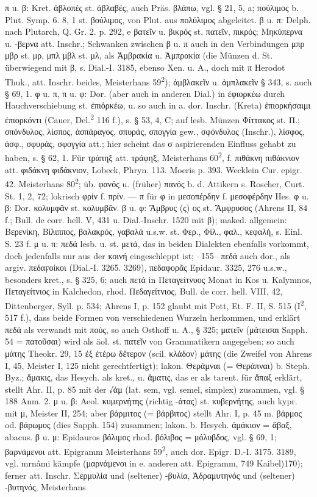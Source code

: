 π u. β: Kret. ἀβλοπές st. ἀβλαβές, auch Präs. βλάπω, vgl. § 21, 5, a;  πούλιμος b. Plut. Symp. 6. 8, 1 st. βούλιμος, von Plut. aus πολύλιμος abgeleitet. β u. π: Delph. nach Plutarch, Q. Gr. 2. p. 292, e βατεῖν u. βικρός st. πατεῖν, πικρός; Μηκύπερνα u. -βερνα att. Inschr.; Schwanken zwischen β u. π auch in den Verbindungen μπρ μβρ st. μρ, μπλ μβλ st. μλ, als Ἀμβρακία u. Ἀμπρακία (die Münzen d. St. überwiegend mit β, s. Dial.-I. 3185, ebenso Xen. u. A., doch mit π Herodot Thuk., att. Inschr. beides, Meisterhans 59\textsuperscript{2}); ἀμβλακεῖν u. ἀμπλακεῖν § 343, s. auch § 69, 1. φ u. π, π u. φ: Dor. (aber auch in anderen Dial.) in ἐφιορκέω durch Hauchverschiebung st. ἐπιὁρκέω, u. so auch in a. dor. Inschr. (Kreta) ἐπιορκήσαιμι ἐπιορκόντι (Cauer, Del.\textsuperscript{2} 116 f.), s. § 53, 4, C; auf lesb. Münzen Φίττακος st. Π.; σπόνδυλος, λίσπος, ἀσπάραγος, σπυράς, σπογγία gew., σφόνδυλος (Inschr.), λίσφος, ἀσφ., σφυράς, σφογγία att.; hier scheint das σ aspirierenden Einfluss gehabt zu haben, s. § 62, 1. Für τράπηξ att. τράφηξ, Meisterhans 60\textsuperscript{2}, f. πιθάκνη πιθάκνιον att. φιδάκνη φιδάκνιον, Lobeck, Phryn. 113. Moeris p. 393. Wecklein Cur. epigr. 42. Meisterhans 80\textsuperscript{2}; üb. φανός u. (früher) πανός b. d. Attikern s. Roscher, Curt. St. 1, 2, 72; lokrisch φρίν f. πρίν. — π für φ in μεσοπέρδην f. μεσοφέρδην Hes. φ u. β: Dor. κολυμφᾶν st. κολυμβᾶν. β u. φ: Ἄμβρυς (ς) ος st. Ἄμφρυσος (Ahrens II, 84 f.; Bull. de corr. hell. V, 431 u. Dial.-Inschr. 1520 mit β); maked. allgemein: Βερενίκη, Βίλιππος, βαλακρός, γαβαλά u.s.w. st. Φερ., Φίλ., φαλ., κεφαλή, s. Einl. S. 23 f. μ u. π: πεδά lesb. u.  st. μετά, das in beiden Dialekten ebenfalls vorkommt, doch jedenfalls nur aus der κοινή eingeschleppt ist; --155-- πεδά auch dor., als argiv. πεδαϝοίκοι (Dial.-I. 3265. 3269), πεδαφορᾶς Epidaur. 3325, 276 u.s.w., besonders kret., s. § 325, 6; auch πετά in Πεταγείτνυος Monat in Kos u. Kalymnos, Πεταγείτνιος in Kalchedon, rhod. Πεδαγείτνιος, Bull. de corr. hell. VIII, 42, Dittenberger, Syll. p. 534; Ahrens I, p. 152 glaubt mit Pott, Et. F. II, S. 515 (I\textsuperscript{2}, 517 f.), dass beide Formen von verschiedenen Wurzeln herkommen, und erklärt πεδά als verwandt mit πούς, so auch Osthoff u. A., § 325; ματεῖν (μάτεισαι Sapph. 54 = πατοῦσαι) wird als äol. st. πατεῖν von Grammatikern angegeben; so auch μάτης Theokr. 29, 15 ἐξ ἐτέρω δἔτερον (scil. κλάδον) μάτης (die Zweifel von Ahrens I, 45, Meister I, 125 nicht gerechtfertigt); lakon. Θεράμναι (= Θεράπναι) b. Steph. Byz.; ἄμακις, das Hesych. als kret., u. ἄματις, das er als tarent. für ἅπαξ erklärt, stellt Ahr. II, p. 85 mit der √ἁμ (lat. sem, vgl. semel, simplex) zusammen, vgl. § 188 Anm. 2. μ u. β: Aeol. κυμερνήτης (richtig -άτας) st. κυβερνήτης, auch kypr. mit μ, Meister II, 254; aber βάρμιτος (= βάρβιτος) stellt Ahr. I, p. 45 m. βάρμος od. βάρωμος (dies Sapph. 154) zusammen; lakon. b. Hesych. ἀμάκιον = ἄβαξ, abacus. β u. μ: Epidauros βόλιμος rhod. βόλιβος = μόλυβδος, vgl. § 69, 1; βαρνάμενοι att. Epigramm Meisterhans 59\textsuperscript{2}, auch dor. Epigr. D.-I. 3175. 3189, vgl. mrnâmi kämpfe (μαρνάμενοι in e. anderen att. Epigramm, 749 Kaibel)170); ferner att. Inschr. Σερμυλία und (seltener) -βυλία, Ἀδραμυτηνός und (seltener) -βυτηνός, Meisterhans 